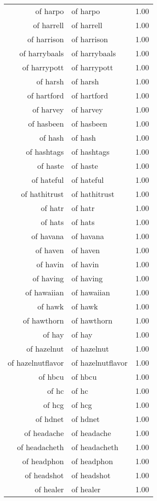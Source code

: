 \begin{table}[ht]
\begin{tabular}{rlr}
  of harpo & of harpo & 1.00 \\ 
  of harrell & of harrell & 1.00 \\ 
  of harrison & of harrison & 1.00 \\ 
  of harrybaals & of harrybaals & 1.00 \\ 
  of harrypott & of harrypott & 1.00 \\ 
  of harsh & of harsh & 1.00 \\ 
  of hartford & of hartford & 1.00 \\ 
  of harvey & of harvey & 1.00 \\ 
  of hasbeen & of hasbeen & 1.00 \\ 
  of hash & of hash & 1.00 \\ 
  of hashtags & of hashtags & 1.00 \\ 
  of haste & of haste & 1.00 \\ 
  of hateful & of hateful & 1.00 \\ 
  of hathitrust & of hathitrust & 1.00 \\ 
  of hatr & of hatr & 1.00 \\ 
  of hats & of hats & 1.00 \\ 
  of havana & of havana & 1.00 \\ 
  of haven & of haven & 1.00 \\ 
  of havin & of havin & 1.00 \\ 
  of having & of having & 1.00 \\ 
  of hawaiian & of hawaiian & 1.00 \\ 
  of hawk & of hawk & 1.00 \\ 
  of hawthorn & of hawthorn & 1.00 \\ 
  of hay & of hay & 1.00 \\ 
  of hazelnut & of hazelnut & 1.00 \\ 
  of hazelnutflavor & of hazelnutflavor & 1.00 \\ 
  of hbcu & of hbcu & 1.00 \\ 
  of hc & of hc & 1.00 \\ 
  of hcg & of hcg & 1.00 \\ 
  of hdnet & of hdnet & 1.00 \\ 
  of headache & of headache & 1.00 \\ 
  of headacheth & of headacheth & 1.00 \\ 
  of headphon & of headphon & 1.00 \\ 
  of headshot & of headshot & 1.00 \\ 
  of healer & of healer & 1.00 \\ 

\end{tabular}
\end{table}
